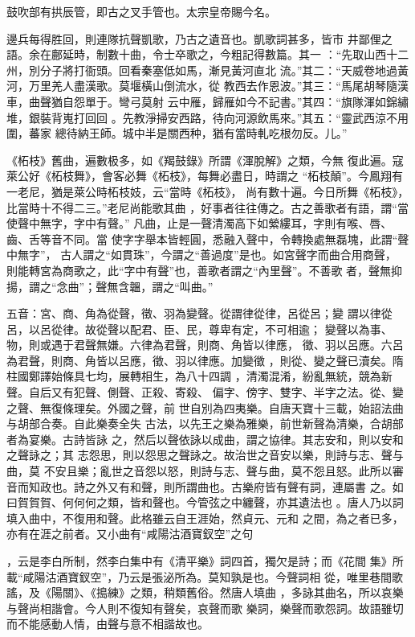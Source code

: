 \documentclass{ctexart}
\begin{document}
鼓吹部有拱辰管，即古之叉手管也。太宗皇帝賜今名。

邊兵每得胜回，則連隊抗聲凱歌，乃古之遺音也。凱歌詞甚多，皆市 井鄙俚之語。余在鄜延時，制數十曲，令士卒歌之，今粗記得數篇。其一 ：``先取山西十二州，別分子將打衙頭。回看秦塞低如馬，漸見黃河直北 流。''其二：``天威卷地過黃河，万里羌人盡漢歌。莫堰橫山倒流水，從 教西去作恩波。''其三：``馬尾胡琴隨漢車，曲聲猶自怨單于。彎弓莫射 云中雁，歸雁如今不記書。''其四：``旗隊渾如錦繡堆，銀裝背嵬打回回 。先教淨掃安西路，待向河源飲馬來。''其五：``靈武西涼不用圍，蕃家 總待納王師。城中半是關西种，猶有當時軋吃根勿反。儿。''

《柘枝》舊曲，遍數极多，如《羯鼓錄》所謂《渾脫解》之類，今無 復此遍。寇萊公好《柘枝舞》，會客必舞《柘枝》，每舞必盡日，時謂之 ``柘枝顛''。今鳳翔有一老尼，猶是萊公時柘枝妓，云``當時《柘枝》， 尚有數十遍。今日所舞《柘枝》，比當時十不得二三。''老尼尚能歌其曲 ，好事者往往傳之。古之善歌者有語，謂``當使聲中無字，字中有聲。'' 凡曲，止是一聲清濁高下如縈縷耳，字則有喉、唇、齒、舌等音不同。當 使字字舉本皆輕圓，悉融入聲中，令轉換處無磊塊，此謂``聲中無字''， 古人謂之``如貫珠''，今謂之``善過度''是也。如宮聲字而曲合用商聲， 則能轉宮為商歌之，此``字中有聲''也，善歌者謂之``內里聲''。不善歌 者，聲無抑揚，謂之``念曲''；聲無含韞，謂之``叫曲。''

五音：宮、商、角為從聲，徵、羽為變聲。從謂律從律，呂從呂；變 謂以律從呂，以呂從律。故從聲以配君、臣、民，尊卑有定，不可相逾； 變聲以為事、物，則或遇于君聲無嫌。六律為君聲，則商、角皆以律應， 徵、羽以呂應。六呂為君聲，則商、角皆以呂應，徵、羽以律應。加變徵 ，則從、變之聲已瀆矣。隋柱國鄭譯始條具七均，展轉相生，為八十四調 ，清濁混淆，紛亂無統，競為新聲。自后又有犯聲、側聲、正殺、寄殺、 偏字、傍字、雙字、半字之法。從、變之聲、無復條理矣。外國之聲，前 世自別為四夷樂。自唐天寶十三載，始詔法曲与胡部合奏。自此樂奏全失 古法，以先王之樂為雅樂，前世新聲為清樂，合胡部者為宴樂。古詩皆詠 之，然后以聲依詠以成曲，謂之協律。其志安和，則以安和之聲詠之；其 志怨思，則以怨思之聲詠之。故治世之音安以樂，則詩与志、聲与曲，莫 不安且樂；亂世之音怨以怒，則詩与志、聲与曲，莫不怨且怒。此所以審 音而知政也。詩之外又有和聲，則所謂曲也。古樂府皆有聲有詞，連屬書 之。如曰賀賀賀、何何何之類，皆和聲也。今管弦之中纏聲，亦其遺法也 。唐人乃以詞填入曲中，不復用和聲。此格雖云自王涯始，然貞元、元和 之間，為之者已多，亦有在涯之前者。又小曲有``咸陽沽酒寶釵空''之句

，云是李白所制，然李白集中有《清平樂》詞四首，獨欠是詩；而《花間 集》所載``咸陽沽酒寶釵空''，乃云是張泌所為。莫知孰是也。今聲詞相 從，唯里巷間歌謠，及《陽關》、《搗練》之類，稍類舊俗。然唐人填曲 ，多詠其曲名，所以哀樂与聲尚相諧會。今人則不復知有聲矣，哀聲而歌 樂詞，樂聲而歌怨詞。故語雖切而不能感動人情，由聲与意不相諧故也。
\end{document}
